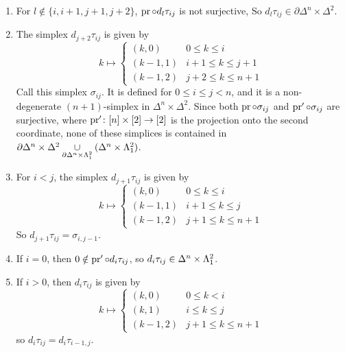         \begin{enumerate}[label=\arabic*)]
            \item 
                For $l \notin \{i, i + 1, j + 1, j + 2\}$, $\operatorname{pr} \circ d_l \tau_{i j}$ is not surjective, So $d_l \tau_{i j} \in \partial \Delta^n \times \Delta^2$.\label{chVI-2-2-1}
            \item 
                The simplex $d_{j+2} \tau_{i j}$ is given by
                \begin{equation*}
                    k \mapsto
                    \begin{cases}
                        (k, 0) & 0 \leq k \leq i \\
                        (k - 1, 1) & i + 1 \leq k \leq j + 1 \\
                        (k - 1, 2) & j + 2 \leq k \leq n + 1
                    \end{cases}
                \end{equation*}
                Call this simplex $\sigma_{i j}$. It is defined for $0 \leq i \leq j < n$, and it is a non-degenerate $(n+1)$-simplex in $\Delta^n \times \Delta^2$. Since both $\operatorname{pr} \circ \sigma_{i j}$ and $\operatorname{pr}' \circ \sigma_{i j}$ are surjective, where $\operatorname{pr}' \colon [n] \times [2] \to [2]$ is the projection onto the second coordinate, none of these simplices is contained in $\partial \Delta^n \times \Delta^2 \underset{\partial \Delta^n \times \Lambda^{2}_{1}}{\cup} (\Delta^n \times \Lambda^{2}_{1})$.\label{chVI-2-2-2}
            \item 
                For $i < j$, the simplex $d_{j+1} \tau_{i j}$ is given by
                \begin{equation*}
                    k \mapsto
                    \begin{cases}
                        (k, 0) & 0 \leq k \leq i \\
                        (k - 1, 1) & i + 1 \leq k \leq j \\
                        (k - 1, 2) & j + 1 \leq k \leq n + 1
                    \end{cases}
                \end{equation*}
                So $d_{j+1} \tau_{i j} = \sigma_{i, j-1}$.\label{chVI-2-2-3}
            \item 
                If $i = 0$, then $0 \notin \operatorname{pr}' \circ d_i \tau_{i j}$, so $d_i \tau_{i j} \in \Delta^n \times \Lambda^{2}_{1}$.\label{chVI-2-2-4}
            \item 
                If $i > 0$, then $d_i \tau_{i j}$ is given by
                \begin{equation*}
                    k \mapsto
                    \begin{cases}
                        (k, 0) & 0 \leq k < i \\
                        (k, 1) & i \leq k \leq j \\
                        (k - 1, 2) & j + 1 \leq k \leq n + 1
                    \end{cases}
                \end{equation*}
                so $d_i \tau_{i j} = d_i \tau_{i-1, j}$.\label{chVI-2-2-5}
        \end{enumerate}
